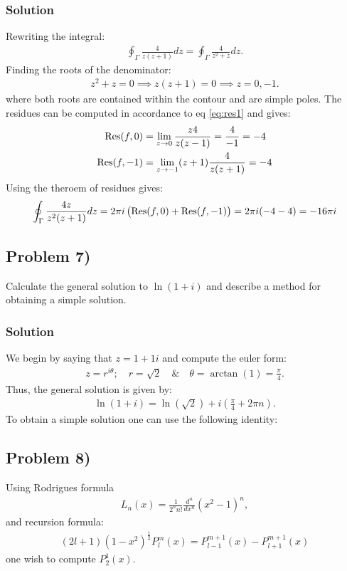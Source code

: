 \subsubsection*{Solution}
Rewriting the integral:
\begin{align*}
    \oint_\Gamma\frac{4}{z(z + 1)}dz = \oint_\Gamma\frac{4}{z^2 + z}dz.
\end{align*}Finding the roots of the denominator:
\begin{align*}
    z^2 + z = 0 \implies z(z + 1) = 0 \implies z = 0, -1.
\end{align*}where both roots are contained within the contour and are simple poles. The residues can be computed in accordance to eq \eqref{eq:res1} and gives:
\begin{align*}
    \text{Res}(f,0) &= \lim_{z\to0}\frac{z4}{z(z-1)} = \frac{4}{-1} = -4\\
    \text{Res}(f,-1) &=\lim_{z\to -1} (z + 1)\frac{4}{z(z+1)} = -4
\end{align*}Using the theroem of residues gives:
\begin{align*}
    \oint_\Gamma\frac{4z}{z^2(z+1)}dz = 2\pi i\left(\text{Res}(f,0) + \text{Res}(f,-1)\right) = 2\pi i(-4 - 4) = -16\pi i
\end{align*}

\subsection*{Problem 7)}
Calculate the general solution to $\ln(1 + i)$ and describe a method for obtaining a simple solution.

\subsubsection*{Solution}
We begin by saying that $z = 1 + 1i$ and compute the euler form:
\begin{align*}
    z = r^{i\theta};\quad  r = \sqrt{2}\quad  \& \quad \theta = \arctan(1) = \frac{\pi}{4}.
\end{align*}
Thus, the general solution is given by:
\begin{align*}
    \ln(1 + i) = \ln(\sqrt{2}) + i\left(\frac{\pi}{4} + 2\pi n\right).
\end{align*}To obtain a simple solution one can use the following identity:

\subsection*{Problem 8)}
Using Rodrigues formula
\begin{align*}
    L_n(x) = \frac{1}{2^nn!}\frac{d^n}{dx^n}(x^2-1)^n,
\end{align*}and recursion formula:
\begin{align}
    (2l +  1)(1-x^2)^{\frac{1}{2}}P_{l}^m(x) = P_{l - 1}^{m + 1}(x) - P_{l + 1}^{m + 1}(x) \label{eq: recursion}
\end{align}one wish to compute $P_2^1(x)$. 

